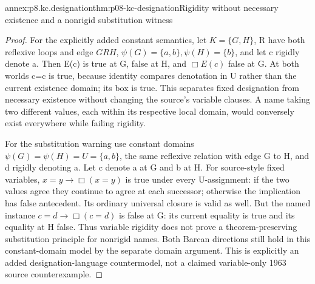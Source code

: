 \begin{annexitem}{annex:p8.kc.designation}{thm:p08-kc-designation}{Rigidity without necessary existence and a nonrigid substitution witness}
\begin{proof}
For the explicitly added constant semantics, let
\(K=\{G,H\}\), R have both reflexive loops and edge
\(GRH\), \(\psi(G)=\{a,b\},\psi(H)=\{b\}\),
and let c rigidly denote a. Then E(c) is true at G, false
at H, and \(\Box E(c)\) false at G. At both worlds
c=c is true, because identity compares denotation in U rather
than the current existence domain; its box is true. This
separates fixed designation from necessary existence without
changing the source's variable clauses. A name taking two
different values, each within its respective local domain,
would conversely exist everywhere while failing rigidity.

For the substitution warning use constant domains
\(\psi(G)=\psi(H)=U=\{a,b\}\), the same reflexive
relation with edge G to H, and d rigidly denoting a. Let
c denote a at G and b at H. For source-style fixed variables,
\(x=y\to\Box(x=y)\) is true under every U-assignment:
if the two values agree they continue to agree at each successor;
otherwise the implication has false antecedent. Its ordinary
universal closure is valid as well. But the named instance
\(c=d\to\Box(c=d)\) is false at G: its current equality
is true and its equality at H false. Thus variable rigidity
does not prove a theorem-preserving substitution principle for
nonrigid names. Both Barcan directions still hold in this
constant-domain model by the separate domain argument. This
is explicitly an added designation-language countermodel,
not a claimed variable-only 1963 source counterexample.
\end{proof}
\end{annexitem}
